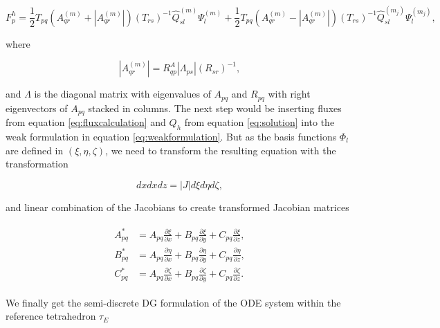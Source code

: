 \begin{equation}
    F_p^h = \frac{1}{2} T_{pq} \left(A_{qr}^{\left(m\right)} + \left|A_{qr}^{\left(m\right)}\right|\right)\left(T_{rs}\right)^{-1}
    \hat{Q}_{sl}^{\left(m\right)} \Psi_l^{\left(m\right)} + \frac{1}{2}T_{pq}\left(A_{qr}^{\left(m\right)} - \left|A_{qr}^{\left(m\right)}\right|\right)
    \left(T_{rs}\right)^{-1}\hat{Q}_{sl}^{\left(m_j\right)}\Psi_l^{\left(m_j\right)},
    \label{eq:fluxcalculation}
\end{equation}

where

\begin{equation}
\left|A_{qr}^{\left(m\right)}\right| = R_{qp}^A \left|\Lambda_{ps}\right| \left(R_{sr}\right)^{-1},
\end{equation}
    
and $\Lambda$ is the diagonal matrix with eigenvalues of $A_{pq}$ and $R_{pq}$ with right eigenvectors of $A_{pq}$ stacked in columns.
The next step would be inserting fluxes from equation \ref{eq:fluxcalculation} and $Q_h$ from equation \ref{eq:solution} into the weak
formulation in equation \ref{eq:weakformulation}. But as the basis functions $\Phi_l$ are defined in $\left(\xi, \eta, \zeta\right)$, we need
to transform the resulting equation with the transformation

\begin{equation}
    dx dx dz = \left|J\right| d\xi d\eta d\zeta,
\end{equation}

and linear combination of the Jacobians to create transformed Jacobian matrices

\begin{align}
    \begin{split}
        A_{pq}^{*} &= A_{pq} \frac{\partial \xi}{\partial x} + B_{pq} \frac{\partial \xi}{\partial y} + C_{pq} \frac{\partial \xi}{\partial z}, \\
        B_{pq}^{*} &= A_{pq} \frac{\partial \eta}{\partial x} + B_{pq} \frac{\partial \eta}{\partial y} + C_{pq} \frac{\partial \eta}{\partial z}, \\ 
        C_{pq}^{*} &= A_{pq} \frac{\partial \zeta}{\partial x} + B_{pq} \frac{\partial \zeta}{\partial y} + C_{pq} \frac{\partial \zeta}{\partial z}. 
    \end{split}
\end{align}

We finally get the semi-discrete \ac{DG} formulation of the ODE system within the reference tetrahedron $\tau_E$

